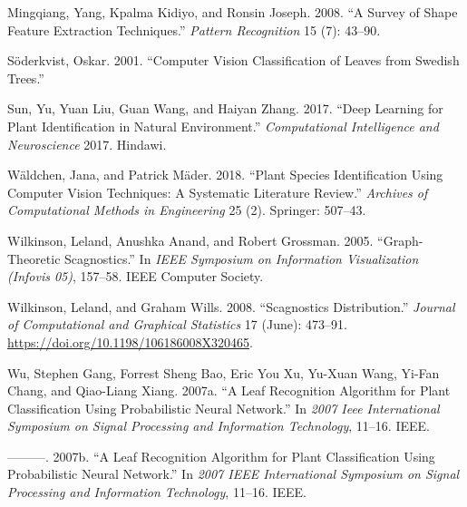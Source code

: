\documentclass{article}
\begin{document}
\leavevmode\hypertarget{ref-article7}{}%
Mingqiang, Yang, Kpalma Kidiyo, and Ronsin Joseph. 2008. ``A Survey of
Shape Feature Extraction Techniques.'' \emph{Pattern Recognition} 15
(7): 43--90.

\leavevmode\hypertarget{ref-soderkvist2001computer}{}%
Söderkvist, Oskar. 2001. ``Computer Vision Classification of Leaves from
Swedish Trees.''

\leavevmode\hypertarget{ref-sun2017deep}{}%
Sun, Yu, Yuan Liu, Guan Wang, and Haiyan Zhang. 2017. ``Deep Learning
for Plant Identification in Natural Environment.'' \emph{Computational
Intelligence and Neuroscience} 2017. Hindawi.

\leavevmode\hypertarget{ref-articlee}{}%
Wäldchen, Jana, and Patrick Mäder. 2018. ``Plant Species Identification
Using Computer Vision Techniques: A Systematic Literature Review.''
\emph{Archives of Computational Methods in Engineering} 25 (2).
Springer: 507--43.

\leavevmode\hypertarget{ref-inproceedings44}{}%
Wilkinson, Leland, Anushka Anand, and Robert Grossman. 2005.
``Graph-Theoretic Scagnostics.'' In \emph{IEEE Symposium on Information
Visualization (Infovis 05)}, 157--58. IEEE Computer Society.

\leavevmode\hypertarget{ref-article37}{}%
Wilkinson, Leland, and Graham Wills. 2008. ``Scagnostics Distribution.''
\emph{Journal of Computational and Graphical Statistics} 17 (June):
473--91. \url{https://doi.org/10.1198/106186008X320465}.

\leavevmode\hypertarget{ref-4458016}{}%
Wu, Stephen Gang, Forrest Sheng Bao, Eric You Xu, Yu-Xuan Wang, Yi-Fan
Chang, and Qiao-Liang Xiang. 2007a. ``A Leaf Recognition Algorithm for
Plant Classification Using Probabilistic Neural Network.'' In \emph{2007
Ieee International Symposium on Signal Processing and Information
Technology}, 11--16. IEEE.

\leavevmode\hypertarget{ref-wu2007leaf}{}%
---------. 2007b. ``A Leaf Recognition Algorithm for Plant
Classification Using Probabilistic Neural Network.'' In \emph{2007 IEEE
International Symposium on Signal Processing and Information
Technology}, 11--16. IEEE.



\end{document}
